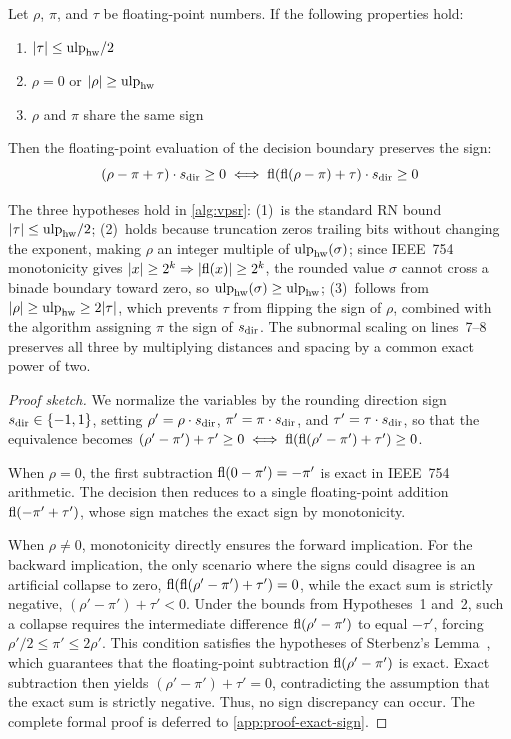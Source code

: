 \begin{theorem}
\label{thm:exact-sign}
Let $\rho$, $\pi$, and $\tau$ be floating-point numbers. If
the following properties hold:
\begin{enumerate}
    \item $|\tau| \le \mathrm{ulp}_{\rm hw}/2$
    \item $\rho = 0$ or $|\rho| \ge \mathrm{ulp}_{\rm hw}$
    \item $\rho$ and $\pi$ share the same sign
\end{enumerate}
Then the floating-point evaluation of the decision boundary preserves the sign:
\[
(\rho - \pi + \tau) \cdot s_{\rm dir} \ge 0 \iff \mathrm{fl}(\mathrm{fl}(\rho - \pi) + \tau) \cdot s_{\rm dir} \ge 0
\]
\end{theorem}

The three hypotheses hold in \cref{alg:vpsr}: (1)~is the standard RN bound $|\tau| \le \mathrm{ulp}_{\rm hw}/2$; (2)~holds because truncation zeros trailing bits without changing the exponent, making $\rho$ an integer multiple of $\mathrm{ulp}_{\rm hw}(\sigma)$; since IEEE~754 monotonicity gives $|x| \ge 2^k \Rightarrow |\mathrm{fl}(x)| \ge 2^k$, the rounded value $\sigma$ cannot cross a binade boundary toward zero, so $\mathrm{ulp}_{\rm hw}(\sigma) \ge \mathrm{ulp}_{\rm hw}$; (3)~follows from $|\rho| \ge \mathrm{ulp}_{\rm hw} \ge 2|\tau|$, which prevents $\tau$ from flipping the sign of $\rho$, combined with the algorithm assigning $\pi$ the sign of $s_{\rm dir}$. The subnormal scaling on lines~7--8 preserves all three by multiplying distances and spacing by a common exact power of two.

\begin{proof}[Proof sketch]
We normalize the variables by the rounding direction sign $s_{\rm dir} \in \{-1, 1\}$, setting $\rho' = \rho \cdot s_{\rm dir}$, $\pi' = \pi \cdot s_{\rm dir}$, and $\tau' = \tau \cdot s_{\rm dir}$, so that the equivalence becomes $(\rho' - \pi') + \tau' \ge 0 \iff \mathrm{fl}(\mathrm{fl}(\rho' - \pi') + \tau') \ge 0$.

When $\rho = 0$, the first subtraction $\mathrm{fl}(0 - \pi') = -\pi'$ is exact in IEEE~754 arithmetic. The decision then reduces to a single floating-point addition $\mathrm{fl}(-\pi' + \tau')$, whose sign matches the exact sign by monotonicity.

When $\rho \ne 0$, monotonicity directly ensures the forward implication. For the backward implication, the only scenario where the signs could disagree is an artificial collapse to zero, $\mathrm{fl}(\mathrm{fl}(\rho' - \pi') + \tau') = 0$, while the exact sum is strictly negative, $(\rho' - \pi') + \tau' < 0$. Under the bounds from Hypotheses~1 and~2, such a collapse requires the intermediate difference $\mathrm{fl}(\rho' - \pi')$ to equal $-\tau'$, forcing $\rho'/2 \le \pi' \le 2\rho'$. This condition satisfies the hypotheses of Sterbenz's Lemma~\citep{sterbenz1974floating}, which guarantees that the floating-point subtraction $\mathrm{fl}(\rho' - \pi')$ is exact. Exact subtraction then yields $(\rho' - \pi') + \tau' = 0$, contradicting the assumption that the exact sum is strictly negative. Thus, no sign discrepancy can occur. The complete formal proof is deferred to \cref{app:proof-exact-sign}.
\end{proof}
